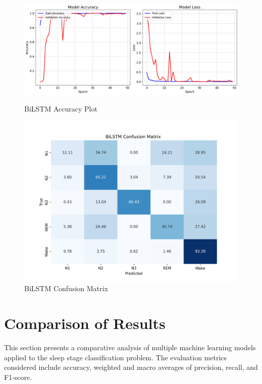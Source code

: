 \begin{figure}[H]
	\centering
	\begin{minipage}{0.66\textwidth}
		\centering
		\includegraphics[width=\linewidth]{img/paper_2/BILSTM Accuaracy Plot.png}
		\caption{BiLSTM Accuracy Plot}
		\label{fig:bilstm_accuracy}
	\end{minipage}
	\hfill
	\begin{minipage}{0.32\textwidth}
		\centering
		\includegraphics[width=\linewidth]{img/paper_2/BiLSTM_cm.png}
		\caption{BiLSTM Confusion Matrix}
		\label{fig:bilstm_cm}
	\end{minipage}
\end{figure}



\section{Comparison of Results}



This section presents a comparative analysis of multiple machine learning models applied to the sleep stage classification problem. The evaluation metrics considered include accuracy, weighted and macro averages of precision, recall, and F1-score.


